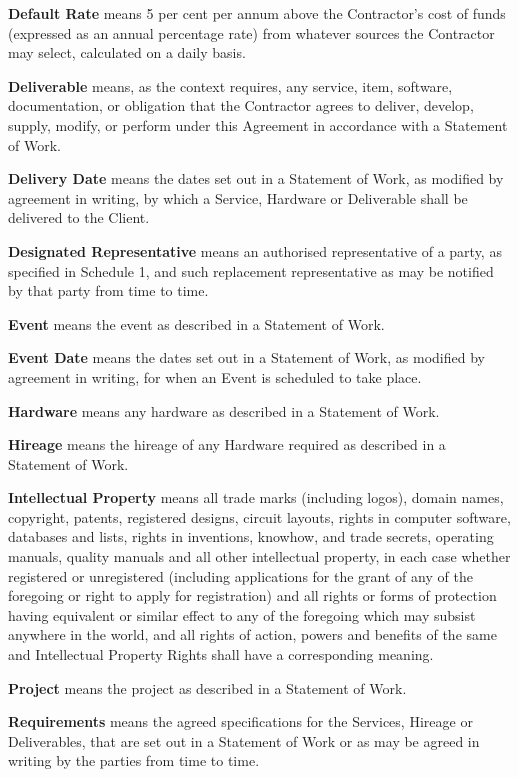 \documentclass[a4paper,12pt]{article}
\begin{document}
\textbf{Default Rate} means 5 per cent per annum above the Contractor’s cost of funds (expressed as an annual percentage rate) from whatever sources the Contractor may select, calculated on a daily basis.

\textbf{Deliverable} means, as the context requires, any service, item, software, documentation, or obligation that the Contractor agrees to deliver, develop, supply, modify, or perform under this Agreement in accordance with a Statement of Work.

\textbf{Delivery Date} means the dates set out in a Statement of Work, as modified by agreement in writing, by which a Service, Hardware or Deliverable shall be delivered to the Client.

\textbf{Designated Representative} means an authorised representative of a party, as specified in Schedule 1, and such replacement representative as may be notified by that party from time to time.

\textbf{Event} means the event as described in a Statement of Work.

\textbf{Event Date} means the dates set out in a Statement of Work, as modified by agreement in writing, for when an Event is scheduled to take place.

\textbf{Hardware} means any hardware as described in a Statement of Work.

\textbf{Hireage} means the hireage of any Hardware required as described in a Statement of Work.

\textbf{Intellectual Property} means all trade marks (including logos), domain names, copyright, patents, registered designs, circuit layouts, rights in computer software, databases and lists, rights in inventions, knowhow, and trade secrets, operating manuals, quality manuals and all other intellectual property, in each case whether registered or unregistered (including applications for the grant of any of the foregoing or right to apply for registration) and all rights or forms of protection having equivalent or similar effect to any of the foregoing which may subsist anywhere in the world, and all rights of action, powers and benefits of the same and Intellectual Property Rights shall have a corresponding meaning.

\textbf{Project} means the project as described in a Statement of Work.

\textbf{Requirements} means the agreed specifications for the Services, Hireage or Deliverables, that are set out in a Statement of Work or as may be agreed in writing by the parties from time to time.
\end{document}
